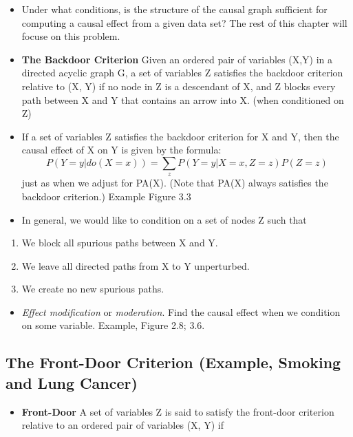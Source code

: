\documentclass[]{article}
\providecommand{\tightlist}{%
  \setlength{\itemsep}{0pt}\setlength{\parskip}{0pt}}
\begin{document}
\begin{itemize}
\item
  Under what conditions, is the structure of the causal graph sufficient
  for computing a causal effect from a given data set? The rest of this
  chapter will focuse on this problem.
\item
  \textbf{The Backdoor Criterion} Given an ordered pair of variables
  (X,Y) in a directed acyclic graph G, a set of variables Z satisfies
  the backdoor criterion relative to (X, Y) if no node in Z is a
  descendant of X, and Z blocks every path between X and Y that contains
  an arrow into X. (when conditioned on Z)
\item
  If a set of variables Z satisfies the backdoor criterion for X and Y,
  then the causal effect of X on Y is given by the formula: \[
  P(Y = y|do(X = x)) = \sum_z P(Y = y|X = x, Z = z)P(Z = z)
  \] just as when we adjust for PA(X). (Note that PA(X) always satisfies
  the backdoor criterion.) Example Figure 3.3
\item
  In general, we would like to condition on a set of nodes Z such that
\end{itemize}

\begin{enumerate}
\def\labelenumi{\arabic{enumi}.}
\tightlist
\item
  We block all spurious paths between X and Y.
\item
  We leave all directed paths from X to Y unperturbed.
\item
  We create no new spurious paths.
\end{enumerate}

\begin{itemize}
\tightlist
\item
  \emph{Effect modification} or \emph{moderation}. Find the causal
  effect when we condition on some variable. Example, Figure 2.8; 3.6.
\end{itemize}

\subsection{The Front-Door Criterion (Example, Smoking and Lung
Cancer)}\label{the-front-door-criterion-example-smoking-and-lung-cancer}

\begin{itemize}
\tightlist
\item
  \textbf{Front-Door} A set of variables Z is said to satisfy the
  front-door criterion relative to an ordered pair of variables (X, Y)
  if
\end{itemize}
\end{document}
